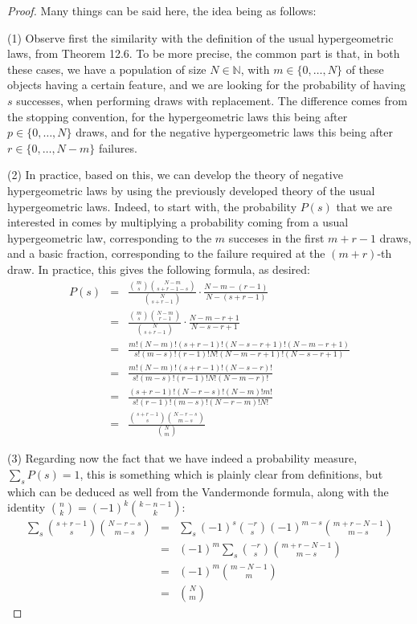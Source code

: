 \documentclass[12pt]{amsbook}
\begin{document}
\begin{proof}
Many things can be said here, the idea being as follows:

\medskip

(1) Observe first the similarity with the definition of the usual hypergeometric laws, from Theorem 12.6. To be more precise, the common part is that, in both these cases, we have a population of size $N\in\mathbb N$, with $m\in\{0,\ldots,N\}$ of these objects having a certain feature, and we are looking for the probability of having $s$ successes, when performing draws with replacement. The difference comes from the stopping convention, for the hypergeometric laws this being after $p\in\{0,\ldots,N\}$ draws, and for the negative hypergeometric laws this being after $r\in\{0,\ldots,N-m\}$ failures.

\medskip

(2) In practice, based on this, we can develop the theory of negative hypergeometric laws by using the previously developed theory of the usual hypergeometric laws. Indeed, to start with, the probability $P(s)$ that we are interested in comes by multiplying a probability coming from a usual hypergeometric law, corresponding to the $m$ succeses in the first $m+r-1$ draws, and a basic fraction, corresponding to the failure required at the $(m+r)$-th draw. In practice, this gives the following formula, as desired:
\begin{eqnarray*}
P(s)
&=&\frac{\binom{m}{s}\binom{N-m}{s+r-1-s}}{\binom{N}{s+r-1}}\cdot\frac{N-m-(r-1)}{N-(s+r-1)}\\
&=&\frac{\binom{m}{s}\binom{N-m}{r-1}}{\binom{N}{s+r-1}}\cdot\frac{N-m-r+1}{N-s-r+1}\\
&=&\frac{m!(N-m)!(s+r-1)!(N-s-r+1)!(N-m-r+1)}{s!(m-s)!(r-1)!N!(N-m-r+1)!(N-s-r+1)}\\
&=&\frac{m!(N-m)!(s+r-1)!(N-s-r)!}{s!(m-s)!(r-1)!N!(N-m-r)!}\\
&=&\frac{(s+r-1)!(N-r-s)!(N-m)!m!}{s!(r-1)!(m-s)!(N-r-m)!N!}\\
&=&\frac{\binom{s+r-1}{s}\binom{N-r-s}{m-s}}{\binom{N}{m}}
\end{eqnarray*}

(3) Regarding now the fact that we have indeed a probability measure, $\sum_sP(s)=1$, this is something which is plainly clear from definitions, but which can be deduced as well from the Vandermonde formula, along with the identity $\binom{n}{k}=(-1)^k\binom{k-n-1}{k}$:
\begin{eqnarray*}
\sum_s\binom{s+r-1}{s}\binom{N-r-s}{m-s}
&=&\sum_s(-1)^s\binom{-r}{s}(-1)^{m-s}\binom{m+r-N-1}{m-s}\\
&=&(-1)^m\sum_s\binom{-r}{s}\binom{m+r-N-1}{m-s}\\
&=&(-1)^m\binom{m-N-1}{m}\\
&=&\binom{N}{m}
\end{eqnarray*}


\end{proof}
\end{document}

